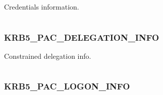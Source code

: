 \documentclass[letterpaper,10pt,english]{sphinxmanual}
\begin{document}
\begin{fulllineitems}
\label{appdev/refs/macros/KRB5_PAC_CREDENTIALS_INFO:KRB5_PAC_CREDENTIALS_INFO}
\end{fulllineitems}


Credentials information.

\begin{tabulary}{\linewidth}{|L|L|}
\hline

 & 
\\
\hline\end{tabulary}



\subsubsection{KRB5\_PAC\_DELEGATION\_INFO}
\label{appdev/refs/macros/KRB5_PAC_DELEGATION_INFO::doc}\label{appdev/refs/macros/KRB5_PAC_DELEGATION_INFO:krb5-pac-delegation-info-data}\label{appdev/refs/macros/KRB5_PAC_DELEGATION_INFO:krb5-pac-delegation-info}

\begin{fulllineitems}
\label{appdev/refs/macros/KRB5_PAC_DELEGATION_INFO:KRB5_PAC_DELEGATION_INFO}
\end{fulllineitems}


Constrained delegation info.

\begin{tabulary}{\linewidth}{|L|L|}
\hline

 & 
\\
\hline\end{tabulary}



\subsubsection{KRB5\_PAC\_LOGON\_INFO}
\label{appdev/refs/macros/KRB5_PAC_LOGON_INFO:krb5-pac-logon-info}\label{appdev/refs/macros/KRB5_PAC_LOGON_INFO:krb5-pac-logon-info-data}\label{appdev/refs/macros/KRB5_PAC_LOGON_INFO::doc}

\begin{fulllineitems}
\label{appdev/refs/macros/KRB5_PAC_LOGON_INFO:KRB5_PAC_LOGON_INFO}
\end{fulllineitems}
\end{document}
